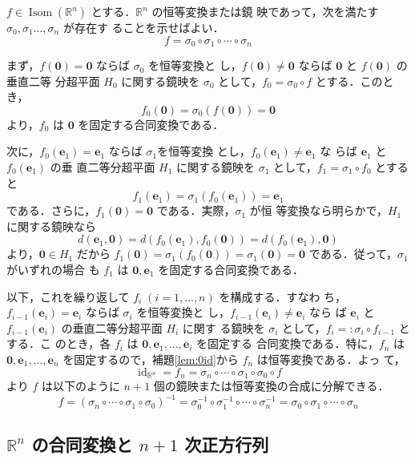 \documentclass[11pt, uplatex, dvipdfmx, titlepage]{jsarticle}
\makeatletter
\DeclareMathOperator{\Isom}{Isom}
\DeclareMathOperator{\id}{id}
\renewenvironment{proof}[1][\proofname]{\par
  \pushQED{\qed}%
  \normalfont \topsep6\p@\@plus6\p@\relax
  \trivlist
  \item[\hskip\labelsep
         \bfseries
    {#1}]\ignorespaces
}{%
  \popQED\endtrivlist\@endpefalse
}
\theoremstyle{definition}
\renewcommand{\proofname}{\textbf{証明}}
\makeatother
\begin{document}
\begin{proof}
  $f \in \Isom(\mathbb{R}^n)$ とする．$\mathbb{R}^n$ の恒等変換または鏡
  映であって，次を満たす $\sigma_0, \sigma_1 \ldots, \sigma_n$ が存在す
  ることを示せばよい．
  \[
    f=\sigma_0 \circ \sigma_1 \circ \cdots \circ \sigma_n
  \]

  まず，$f(\bm{0}) = \bm{0}$ ならば $\sigma_0$ を恒等変換と
  し，$f(\bm{0}) \neq \bm{0}$ ならば $\bm{0}$ と $f(\bm{0})$ の垂直二等
  分超平面 $H_0$ に関する鏡映を $\sigma_0$ として，$f_0=\sigma_0 \circ
  f$ とする．このとき，
  \[
    f_0(\bm{0}) = \sigma_0 \left( f(\bm{0})\right) = \bm{0}
  \]
  より，$f_0$ は $\bm{0}$ を固定する合同変換である．
  
  次に，$f_0(\bm{e}_1) = \bm{e}_1$ ならば $\sigma_1$を恒等変換
  とし，$f_0(\bm{e}_1) \neq \bm{e}_1$ な
  らば $\bm{e}_1$ と$f_0(\bm{e}_1)$ の垂
  直二等分超平面 $H_1$ に関する鏡映を $\sigma_1$ として，$f_1=\sigma_1
  \circ f_0$ とすると
  \[
    f_1(\bm{e}_1) = \sigma_1(f_0(\bm{e}_1)) = \bm{e}_1
  \]
  である．さらに，$f_1(\bm{0}) = \bm{0}$ である．実際，$\sigma_1$ が恒
  等変換なら明らかで，$H_1$ に関する鏡映なら
  \[
    d(\bm{e}_1, \bm{0}) = d\left(f_0(\bm{e}_1), f_0(\bm{0})\right)
    = d\left( f_0(\bm{e}_1), \bm{0}\right)
  \]
  より，$\bm{0} \in H_1$ だから
  $f_1(\bm{0}) = \sigma_1 \left( f_0(\bm{0})\right) = \sigma_1(\bm{0})
  = \bm{0}$ である．従って，$\sigma_1$ がいずれの場合
  も $f_1$ は $\bm{0}, \bm{e}_1$ を固定する合同変換である．

  以下，これを繰り返して $f_i \; ( i=1, \ldots, n)$ を構成する．すなわ
  ち，$f_{i-1}(\bm{e}_i) = \bm{e}_i$ ならば $\sigma_i$ を恒等変換と
  し，$f_{i-1}(\bm{e}_i) \neq \bm{e}_i$ なら
  ば $\bm{e}_i$ と $f_{i-1}(\bm{e}_i)$ の垂直二等分超平面 $H_i$ に関す
  る鏡映を $\sigma_i$ として，$f_i=:\sigma_i \circ f_{i-1}$ とする．こ
  のとき，各 $f_i$ は $\bm{0}, \bm{e}_1, \ldots, \bm{e}_{i}$ を固定する
  合同変換である．特に，$f_n$ は $\bm{0}, \bm{e}_1, \ldots, \bm{e}_n$
  を固定するので，補題\ref{lem:0id}から $f_n$ は恒等変換である．よっ
  て，
  \[
    \id_{\mathbb{R}^n} =  f_n = \sigma_n \circ  \cdots \circ \sigma_1 \circ \sigma_0 \circ f
  \]
  より $f$ は以下のように $n+1$ 個の鏡映または恒等変換の合成に分解できる．
  \[
    f = \left( \sigma_n \circ \cdots \circ \sigma_1 \circ \sigma_0\right)^{-1}
    = \sigma_0^{-1} \circ \sigma_1^{-1} \circ \cdots \circ \sigma_n^{-1}
    = \sigma_0 \circ \sigma_1 \circ \cdots \circ \sigma_n
  \]
\end{proof}


\subsection{$\mathbb{R}^n$ の合同変換と $n+1$ 次正方行列}\label{sec:matrix}
\end{document}
